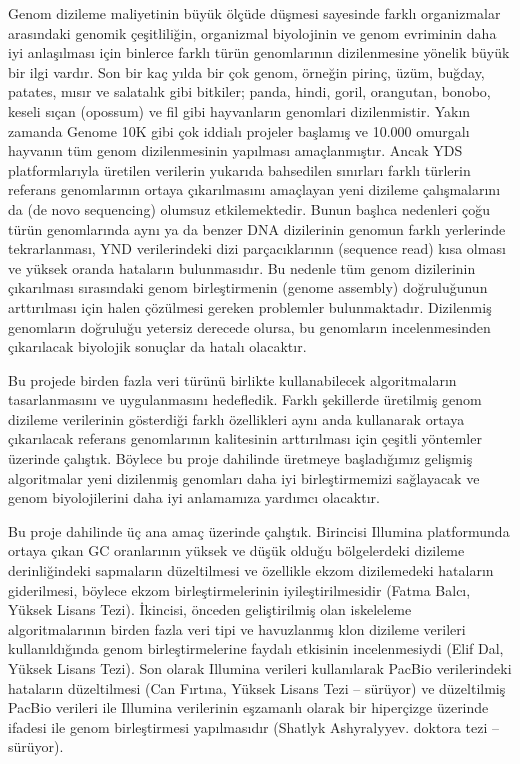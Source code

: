 \documentclass[11pt]{article}
\begin{document}
Genom dizileme maliyetinin büyük ölçüde düşmesi sayesinde farklı organizmalar arasındaki genomik çeşitliliğin, organizmal biyolojinin ve genom evriminin daha iyi anlaşılması için binlerce farklı türün genomlarının dizilenmesine yönelik büyük bir ilgi vardır. Son bir kaç yılda bir çok genom, örneğin pirinç, üzüm, buğday, patates, mısır ve salatalık gibi bitkiler; panda, hindi, goril, orangutan, bonobo, keseli sıçan (opossum) ve fil gibi hayvanların genomlari dizilenmistir. Yakın zamanda Genome 10K gibi çok iddialı projeler başlamış ve 10.000 omurgalı hayvanın tüm genom dizilenmesinin yapılması amaçlanmıştır. Ancak YDS platformlarıyla üretilen verilerin yukarıda bahsedilen sınırları farklı türlerin referans genomlarının ortaya çıkarılmasını amaçlayan yeni dizileme çalışmalarını da (de novo sequencing) olumsuz etkilemektedir. Bunun başlıca nedenleri çoğu türün genomlarında aynı ya da benzer DNA dizilerinin genomun farklı yerlerinde tekrarlanması, YND verilerindeki dizi parçacıklarının (sequence read) kısa olması ve yüksek oranda hataların bulunmasıdır. Bu nedenle tüm genom dizilerinin çıkarılması sırasındaki genom birleştirmenin (genome assembly) doğruluğunun arttırılması için halen çözülmesi gereken problemler bulunmaktadır. Dizilenmiş genomların doğruluğu yetersiz derecede olursa, bu genomların incelenmesinden çıkarılacak biyolojik sonuçlar da hatalı olacaktır.

Bu projede birden fazla veri türünü birlikte kullanabilecek algoritmaların tasarlanmasını ve uygulanmasını hedefledik. Farklı şekillerde üretilmiş genom dizileme verilerinin gösterdiği farklı özellikleri aynı anda kullanarak ortaya çıkarılacak referans genomlarının kalitesinin arttırılması için çeşitli yöntemler üzerinde çalıştık. Böylece bu proje dahilinde üretmeye başladığımız gelişmiş algoritmalar yeni dizilenmiş genomları daha iyi birleştirmemizi sağlayacak ve genom biyolojilerini daha iyi anlamamıza yardımcı olacaktır. 

Bu proje dahilinde üç ana amaç üzerinde çalıştık. Birincisi Illumina platformunda ortaya çıkan GC oranlarının yüksek ve düşük olduğu bölgelerdeki dizileme derinliğindeki sapmaların düzeltilmesi ve özellikle ekzom dizilemedeki hataların giderilmesi, böylece ekzom birleştirmelerinin iyileştirilmesidir (Fatma Balcı, Yüksek Lisans Tezi). İkincisi, önceden geliştirilmiş olan iskeleleme algoritmalarının birden fazla veri tipi ve havuzlanmış klon dizileme verileri kullanıldığında genom birleştirmelerine faydalı etkisinin incelenmesiydi (Elif Dal, Yüksek Lisans Tezi). Son olarak Illumina verileri kullanılarak PacBio verilerindeki hataların düzeltilmesi (Can Fırtına, Yüksek Lisans Tezi -- sürüyor) ve düzeltilmiş PacBio verileri ile Illumina verilerinin eşzamanlı olarak bir hiperçizge üzerinde ifadesi ile genom birleştirmesi yapılmasıdır (Shatlyk Ashyralyyev. doktora tezi -- sürüyor).
\end{document}
